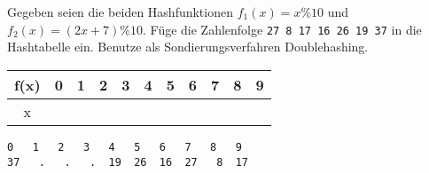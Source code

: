 
\renewcommand{\arraystretch}{2.0}
\setlength{\tabcolsep}{14pt}
\question[3]
Gegeben seien die beiden Hashfunktionen $f_1(x) = x \% 10$ und $f_2(x) = (2x+7) \% 10$.
Füge die Zahlenfolge
\texttt{27 8 17 16 26 19 37}  in die Hashtabelle ein.
Benutze als Sondierungsverfahren Doublehashing.

\begin{tabular}{|c|c|c|c|c|c|c|c|c|c|c|}
\hline f(x) & 0 & 1 & 2 & 3 & 4 & 5 & 6 & 7 & 8 & 9 \\
\hline x     &   &    &    &   &   &    &    &   &   & \\
\hline
\end{tabular}

\ifprintanswers
\begin{solutionbox}{2cm}
\begin{lstlisting}
0   1   2   3   4   5   6   7   8   9
37   .   .   .  19  26  16  27   8  17
\end{lstlisting}
\end{solutionbox}
\fi
